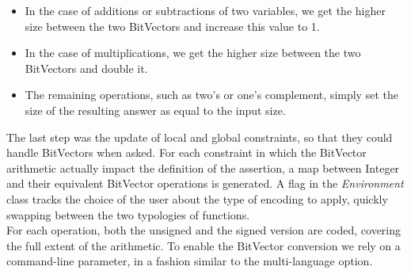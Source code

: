 \begin{itemize}
    \item In the case of additions or subtractions of two variables, we get the higher size between the two BitVectors and increase this value to 1.
    \item In the case of multiplications, we get the higher size between the two BitVectors and double it.
    \item The remaining operations, such as two's or one's complement, simply set the size of the resulting answer as equal to the input size.
\end{itemize}

The last step was the update of local and global constraints, so that they could handle BitVectors when asked. For each constraint in which the BitVector arithmetic actually impact the definition of the assertion, a map between Integer and their equivalent BitVector operations is generated. A flag in the \textit{Environment} class tracks the choice of the user about the type of encoding to apply, quickly swapping between the two typologies of functions. \\
For each operation, both the unsigned and the signed version are coded, covering the full extent of the arithmetic.
To enable the BitVector conversion we rely on a command-line parameter, in a fashion similar to the multi-language option. 

\newpage
